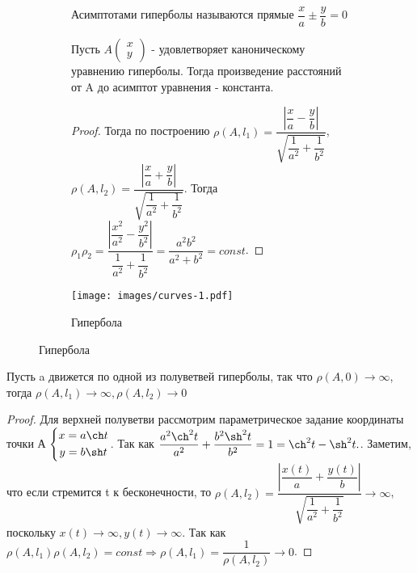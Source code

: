 \begin{figure}[h]
	\begin{subfigure}[t!]{0.6\linewidth}
	\begin{definition}
		Асимптотами гиперболы называются прямые \(\dfrac{x}{a}\pm\dfrac{y}{b}=0\)
	\end{definition}
	\begin{proposition}
		Пусть \(A\begin{pmatrix}
			x \\ y
		\end{pmatrix}\) - удовлетворяет каноническому уравнению гиперболы. Тогда произведение расстояний от A до асимптот уравнения - константа.
	\end{proposition}
	\begin{proof}
		Тогда по построению \(\rho(A, l_1) = \dfrac{|\dfrac{x}{a} - \dfrac{y}{b}|}{\sqrt{\dfrac{1}{a^2}+\dfrac{1}{b^2}}}\),
		\(\rho(A, l_2) = \dfrac{|\dfrac{x}{a} + \dfrac{y}{b}|}{\sqrt{\dfrac{1}{a^2}+\dfrac{1}{b^2}}}\). Тогда \(\rho_1\rho_2 = \dfrac{|\dfrac{x^2}{a^2}-\dfrac{y^2}{b^2}|}{\dfrac{1}{a^2}+\dfrac{1}{b^2}} = \dfrac{a^2b^2}{a^2+b^2}=const\).
	\end{proof}
	\end{subfigure}
	\begin{subfigure}[b!]{0.4\linewidth}
		\centering
		\texttt{[image: images/curves-1.pdf]}
		\caption*{Гипербола}
		\label{Curve2}
	\end{subfigure}
\end{figure}

\begin{corollary}
	Пусть a движется по одной из полуветвей гиперболы, так что \(\rho(A,0)\to\infty\), тогда \(\rho(A, l_1)\to\infty, \rho(A, l_2)\to0\)
\end{corollary}
\begin{proof}
	Для верхней полуветви рассмотрим параметрическое задание координаты точки А \(\left\{\begin{gathered}
		x = a\ch t \\ y = b\sh t
	\end{gathered}\right.\). Так как \(\dfrac{a^2\ch^2t}{a^2}+\dfrac{b^2\sh^2t}{b^2} = 1 = \ch^2t-\sh^2t.\). Заметим, что если стремится t к бесконечности, то \(\rho(A, l_2) = \dfrac{|\dfrac{x(t)}{a}+
	\dfrac{y(t)}{b}|}{\sqrt{\dfrac{1}{a^2}+\dfrac{1}{b^2}}}\to\infty\), поскольку \(x(t)\to\infty, y(t)\to\infty\). Так как \(\rho(A, l_1)\rho(A, l_2)=const\Longrightarrow \rho(A, l_1) = \dfrac{1}{\rho(A, l_2)}\to0\).
\end{proof}
